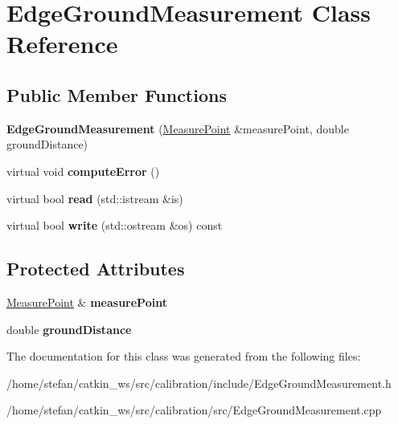\hypertarget{classEdgeGroundMeasurement}{\section{\-Edge\-Ground\-Measurement \-Class \-Reference}
\label{classEdgeGroundMeasurement}
}
\subsection*{\-Public \-Member \-Functions}
\begin{DoxyCompactItemize}
\item 
\hypertarget{classEdgeGroundMeasurement_ae00976acc5f489fe8568a8233fbc1272}{{\bfseries \-Edge\-Ground\-Measurement} (\hyperlink{classCameraMeasurePoint}{\-Measure\-Point} \&measure\-Point, double ground\-Distance)}\label{classEdgeGroundMeasurement_ae00976acc5f489fe8568a8233fbc1272}

\item 
\hypertarget{classEdgeGroundMeasurement_af75822a92c61e0adb9331b2ec55d958a}{virtual void {\bfseries compute\-Error} ()}\label{classEdgeGroundMeasurement_af75822a92c61e0adb9331b2ec55d958a}

\item 
\hypertarget{classEdgeGroundMeasurement_a87de21dbfa80bc1488efd1de22457b5e}{virtual bool {\bfseries read} (std\-::istream \&is)}\label{classEdgeGroundMeasurement_a87de21dbfa80bc1488efd1de22457b5e}

\item 
\hypertarget{classEdgeGroundMeasurement_af94851587e2ce97f359f4b9819c56645}{virtual bool {\bfseries write} (std\-::ostream \&os) const }\label{classEdgeGroundMeasurement_af94851587e2ce97f359f4b9819c56645}

\end{DoxyCompactItemize}
\subsection*{\-Protected \-Attributes}
\begin{DoxyCompactItemize}
\item 
\hypertarget{classEdgeGroundMeasurement_a904e8c85e72111cc476149263e161c08}{\hyperlink{classCameraMeasurePoint}{\-Measure\-Point} \& {\bfseries measure\-Point}}\label{classEdgeGroundMeasurement_a904e8c85e72111cc476149263e161c08}

\item 
\hypertarget{classEdgeGroundMeasurement_a3ab164b8559ee9e5f4c503b620866bd3}{double {\bfseries ground\-Distance}}\label{classEdgeGroundMeasurement_a3ab164b8559ee9e5f4c503b620866bd3}

\end{DoxyCompactItemize}


\-The documentation for this class was generated from the following files\-:\begin{DoxyCompactItemize}
\item 
/home/stefan/catkin\-\_\-ws/src/calibration/include/\-Edge\-Ground\-Measurement.\-h\item 
/home/stefan/catkin\-\_\-ws/src/calibration/src/\-Edge\-Ground\-Measurement.\-cpp\end{DoxyCompactItemize}
